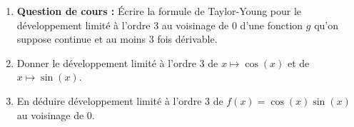 
\begin{exercice}\label{exoanalyseCTU-0019}


\begin{enumerate}
\item\textbf{Question de cours :} Écrire la formule de Taylor-Young pour le développement limité à l'ordre 3 au voisinage de 0 d'une fonction $g$ qu'on suppose continue et au moins 3 fois dérivable. 
\item Donner le développement limité à l'ordre 3 de $x\mapsto \cos(x)$ et de  $x\mapsto \sin(x)$.
\item En déduire développement limité à l'ordre 3 de $f(x) = \cos(x)\sin(x)$ au voisinage de 0.
\end{enumerate}


\end{exercice}
